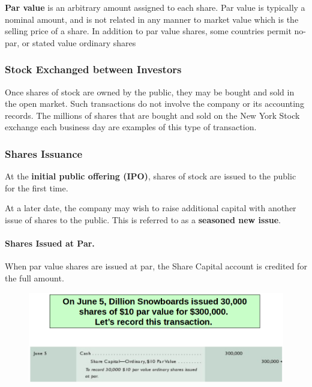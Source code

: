 \documentclass[../main.tex]{subfiles}
\begin{document}
	\textbf{Par value} is an arbitrary amount assigned to each share.  Par 
	value is typically a nominal amount, and is not related in any manner to 
	market value which is the selling price of a share. In addition to par 
	value shares, some countries permit no-par, or stated value ordinary shares
	
	\subsubsection{Stock Exchanged between Investors}
	
	Once shares of stock are owned by the public, they may be bought and sold 
	in the open market. Such transactions do not involve the company or its 
	accounting records. The millions of shares that are bought and sold on the 
	New York Stock exchange each business day are examples of this type of 
	transaction.
	
	\subsubsection{Shares Issuance}
	
	At the \textbf{initial public offering (IPO)}, shares of stock are issued 
	to the public for the first time.
	
	At a later date, the company may wish to raise additional capital with 
	another issue of shares to the public. This is referred to as a 
	\textbf{seasoned new issue}. 
	
	\paragraph{Shares Issued at Par.} When par value shares are issued at par, 
	the Share Capital account is credited for the full amount.  
	
	\begin{figure}[ht]
		\centering
		\includegraphics[width=\columnwidth]{images/c9/share_issue_par.png}
	\end{figure}
	
\end{document}
